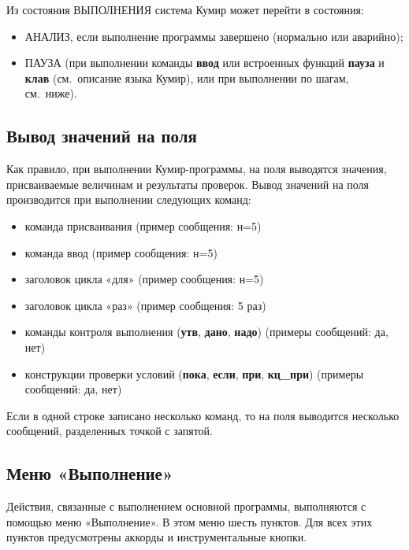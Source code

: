 \documentclass[12pt,a4paper]{article}
\begin{document}
Из состояния ВЫПОЛНЕНИЯ система Кумир может перейти в состояния: 
\begin{itemize}
\item АНАЛИЗ, если выполнение программы завершено (нормально или аварийно);
\item ПАУЗА (при выполнении команды \textsf{\textbf{ввод}} или встроенных функций \textsf{\textbf{пауза}} и \textsf{\textbf{клав}} (см.~описание языка Кумир), или при выполнении по шагам, см.~ниже).
\end{itemize}

\subsection{Вывод значений на поля}
\label{diagnost}

Как правило, при выполнении Кумир-программы, на поля выводятся значения, присваиваемые величинам и результаты проверок. Вывод значений на поля производится при выполнении следующих команд:
\begin{itemize}
\item команда присваивания (пример сообщения: \textsf{н=5})
\item команда ввод (пример сообщения: \textsf{н=5})
\item заголовок цикла «для» (пример сообщения: \textsf{н=5}) 
\item заголовок цикла «раз» (пример сообщения: \textsf{5 раз})
\item команды контроля выполнения (\textsf{\textbf{утв}}, \textsf{\textbf{дано}}, \textsf{\textbf{надо}}) (примеры сообщений: \textsf{да}, \textsf{нет}) 
\item конструкции проверки условий (\textsf{\textbf{пока}}, \textsf{\textbf{если}}, \textsf{\textbf{при}}, \textsf{\textbf{кц\_при}}) (примеры сообщений: \textsf{да}, \textsf{нет}) 
\end{itemize}

Если в одной строке записано несколько команд, то на поля выводится несколько сообщений, разделенных точкой с запятой.

\subsection{Меню «Выполнение»}
\label{menurun}

Действия, связанные с выполнением основной программы, выполняются с помощью меню «Выполнение». В этом меню шесть пунктов. Для всех этих пунктов предусмотрены аккорды и инструментальные кнопки.
\end{document}
